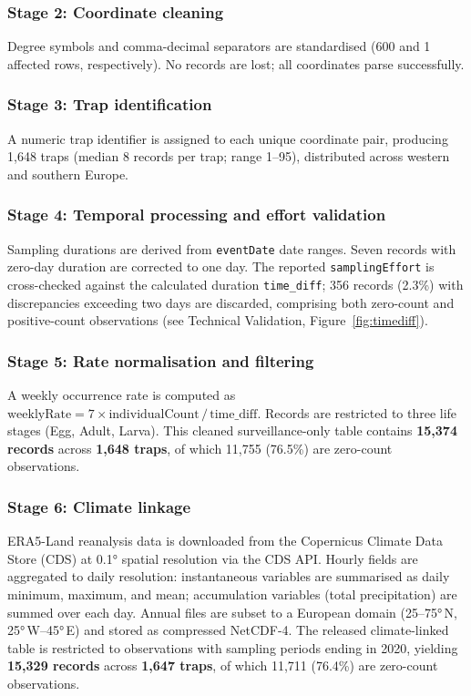 \documentclass[11pt]{article}
\begin{document}
\subsubsection*{Stage 2: Coordinate cleaning}
Degree symbols and comma-decimal separators are standardised (600 and 1 affected rows, respectively). No records are lost; all coordinates parse successfully.

\subsubsection*{Stage 3: Trap identification}
A numeric trap identifier is assigned to each unique coordinate pair, 
producing 1,648 traps (median 8 records per trap; range 1--95), 
distributed across western and southern Europe.

\subsubsection*{Stage 4: Temporal processing and effort validation}
Sampling durations are derived from \texttt{eventDate} date ranges. Seven records with zero-day duration are corrected to one day. The reported \texttt{samplingEffort} is cross-checked against the 
calculated duration \texttt{time\_diff}; 356 records (2.3\%) with 
discrepancies exceeding two days are discarded, comprising both 
zero-count and positive-count observations (see Technical Validation, 
Figure~\ref{fig:timediff}).

\subsubsection*{Stage 5: Rate normalisation and filtering}
A weekly occurrence rate is computed as $\text{weeklyRate} = 7 \times \text{individualCount}\,/\,\text{time\_diff}$. Records are restricted to three life stages (Egg, Adult, Larva). This cleaned surveillance-only table contains \textbf{15,374 records} across \textbf{1,648 
traps}, of which 11,755 (76.5\%) are zero-count observations.

\subsubsection*{Stage 6: Climate linkage}
ERA5-Land reanalysis data \cite{munoz2019_era5} is downloaded from the Copernicus Climate Data Store (CDS) at 0.1° spatial resolution via the CDS API.
Hourly fields are aggregated to daily resolution: instantaneous variables are summarised as daily minimum, maximum, and mean; accumulation variables (total precipitation) are summed over each day.
Annual files are subset to a European domain (25--75°\,N, 25°\,W--45°\,E) and stored as compressed NetCDF-4.
The released climate-linked table is restricted to observations with sampling periods ending in 2020, yielding \textbf{15,329 records} across \textbf{1,647 traps}, of which 11,711 (76.4\%) are zero-count observations.
\end{document}
